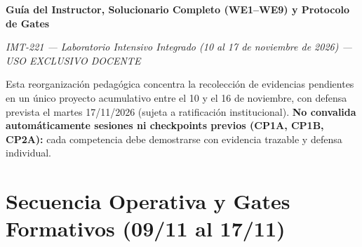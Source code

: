 \documentclass[11pt, a4paper]{article}
\begin{document}
\begin{center}
    {\LARGE \textbf{Guía del Instructor, Solucionario Completo (WE1--WE9) y Protocolo de Gates}}
    \par\vspace{0.15cm}
    \textit{IMT-221 — Laboratorio Intensivo Integrado (10 al 17 de noviembre de 2026) — USO EXCLUSIVO DOCENTE}
\end{center}

\begin{tcolorbox}[colback=ucbblue!5, colframe=ucbblue, title=\textbf{Directriz de Gestión Académica y Seguridad}]
    Esta reorganización pedagógica concentra la recolección de evidencias pendientes en un único proyecto acumulativo entre el 10 y el 16 de noviembre, con defensa prevista el martes 17/11/2026 (sujeta a ratificación institucional). \textbf{No convalida automáticamente sesiones ni checkpoints previos (CP1A, CP1B, CP2A):} cada competencia debe demostrarse con evidencia trazable y defensa individual.
\end{tcolorbox}

\section{Secuencia Operativa y Gates Formativos (09/11 al 17/11)}
\end{document}
